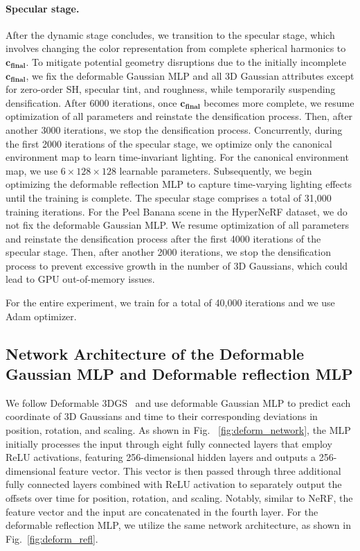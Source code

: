 \paragraph{Specular stage.} 
After the dynamic stage concludes, we transition to the specular stage, which involves changing the color representation from complete spherical harmonics to $\mathbf{c}_\mathbf{final}$. To mitigate potential geometry disruptions due to the initially incomplete $\mathbf{c}_\mathbf{final}$, we fix the deformable Gaussian MLP and all 3D Gaussian attributes except for zero-order SH, specular tint, and roughness, while temporarily suspending densification. After 6000 iterations, once $\mathbf{c}_\mathbf{final}$ becomes more complete, we resume optimization of all parameters and reinstate the densification process. Then, after another 3000 iterations, we stop the densification process. Concurrently, during the first 2000 iterations of the specular stage, we optimize only the canonical environment map to learn time-invariant lighting. For the canonical environment map, we use $6 \times 128 \times 128$ learnable parameters. Subsequently, we begin optimizing the deformable reflection MLP to capture time-varying lighting effects until the training is complete. The specular stage comprises a total of 31,000 training iterations. For the Peel Banana scene in the HyperNeRF dataset, we do not fix the deformable Gaussian MLP. We resume optimization of all parameters and reinstate the densification process after the first 4000 iterations of the specular stage. Then, after another 2000 iterations, we stop the densification process to prevent excessive growth in the number of 3D Gaussians, which could lead to GPU out-of-memory issues.

For the entire experiment, we train for a total of 40,000 iterations and we use Adam optimizer.


\subsection{Network Architecture of the Deformable Gaussian MLP and Deformable reflection MLP}


We follow Deformable 3DGS~\citep{yang2023deformable} and use deformable Gaussian MLP to predict each coordinate of 3D Gaussians and time to their corresponding deviations in position, rotation, and scaling. As shown in Fig. ~\ref{fig:deform_network}, the MLP initially processes the input through eight fully connected layers that employ ReLU activations, featuring 256-dimensional hidden layers and outputs a 256-dimensional feature vector. This vector is then passed through three additional fully connected layers combined with ReLU activation to separately output the offsets over time for position, rotation, and scaling. Notably, similar to NeRF, the feature vector and the input are concatenated in the fourth layer. For the deformable reflection MLP, we utilize the same network architecture, as shown in Fig.~\ref{fig:deform_refl}.

